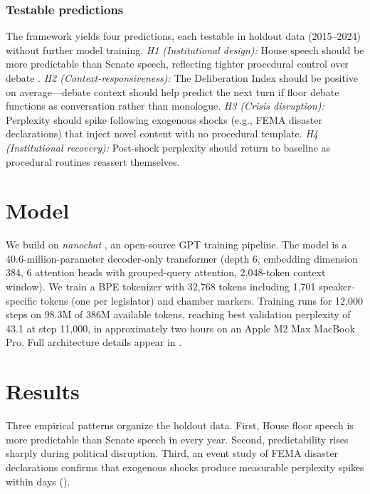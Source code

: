 \documentclass[12pt]{article}
\begin{document}
\subsubsection*{Testable predictions}
The framework yields four predictions, each testable in holdout data (2015--2024) without further model training. \textit{H1 (Institutional design):} House speech should be more predictable than Senate speech, reflecting tighter procedural control over debate \citep{perssonTabellini2003}. \textit{H2 (Context-responsiveness):} The Deliberation Index should be positive on average---debate context should help predict the next turn if floor debate functions as conversation rather than monologue. \textit{H3 (Crisis disruption):} Perplexity should spike following exogenous shocks (e.g., FEMA disaster declarations) that inject novel content with no procedural template. \textit{H4 (Institutional recovery):} Post-shock perplexity should return to baseline as procedural routines reassert themselves.


\section{Model}

We build on \textit{nanochat} \citep{karpathy2025}, an open-source GPT training pipeline. The model is a 40.6-million-parameter decoder-only transformer (depth 6, embedding dimension 384, 6 attention heads with grouped-query attention, 2,048-token context window). We train a BPE tokenizer with 32,768 tokens including 1,701 speaker-specific tokens (one per legislator) and chamber markers. Training runs for 12,000 steps on 98.3M of 386M available tokens, reaching best validation perplexity of 43.1 at step 11,000, in approximately two hours on an Apple M2 Max MacBook Pro. Full architecture details appear in .


\section{Results}

Three empirical patterns organize the holdout data. First, House floor speech is more predictable than Senate speech in every year. Second, predictability rises sharply during political disruption. Third, an event study of FEMA disaster declarations confirms that exogenous shocks produce measurable perplexity spikes within days ().
\end{document}
